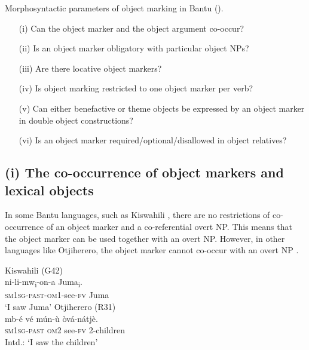 \documentclass[output=paper]{langscibook}
\begin{document}
\ea\label{extab:ngunga:1}
Morphosyntactic parameters of object marking in Bantu (\citealt[5]{MartenKula2012}).\\
\begin{enumerate}
\item[(i)]  Can the object marker and the object argument co-occur? \\
\item[(ii)] Is an object marker obligatory with particular object NPs? \\
\item[(iii)]Are there locative object markers?\\
\item[(iv)] Is object marking restricted to one object marker per verb? \\
\item[(v)]  Can either benefactive or theme objects be expressed by an object marker in double object constructions? \\
\item[(vi)] Is an object marker required/optional/disallowed in object relatives? \\
\end{enumerate}
\z

\subsection{(i) The co-occurrence of object markers and lexical objects}

In some Bantu languages, such as Kiswahili , there are no restrictions of co-occurrence of an object marker and a co-referential overt NP. This means that the object marker can be used together with an overt NP. However, in other languages like Otjiherero, the object marker cannot co-occur with an overt NP .\pagebreak[3]

\ea\label{ex:ngunga:7} Kiswahili (G42)  \citep[240]{MartenKula2012}\\
\gll ni-li-mw\textsubscript{i}{}-on-a    Juma\textsubscript{i}.\\
{\textsc{sm1sg}}{}-{\textsc{past}-\textsc{om}1}{}-see-{\textsc{fv}}  Juma\\
\glt ‘I saw Juma’
\ex \label{ex:ngunga:8}  Otjiherero (R31)\citep[240]{MartenKula2012}\\
\gll * mb-é    vé  mún-ù    òvá-nátjè.\\
     {} \textsc{sm1sg}-\textsc{past}  \textsc{om}2 see{{}-\textsc{fv}} 2-children\\
\glt \phantom{*} Intd.: ‘I saw the children’
\end{document}
